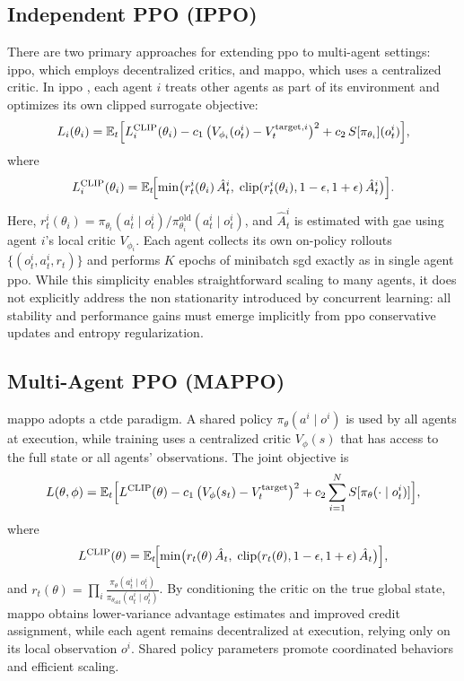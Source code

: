 \subsection{Independent PPO (IPPO)}
There are two primary approaches for extending \gls{ppo} to multi-agent settings: \gls{ippo}, which employs decentralized critics, and \gls{mappo}, which uses a centralized critic.
In \gls{ippo} \cite{witt_is_2020}, each agent \(i\) treats other agents as part of its environment and optimizes its own clipped surrogate objective:
\[
L_i(\theta_i) = \mathbb{E}_t\Bigl[L^{\mathrm{CLIP}}_i(\theta_i) 
  - c_1\,\bigl(V_{\phi_i}(o^i_t)-V^{\text{target},i}_t\bigr)^2 
  + c_2\,S[\pi_{\theta_i}](o^i_t)\Bigr],
\]
where
\[
L^{\mathrm{CLIP}}_i(\theta_i) = \mathbb{E}_t\!\Bigl[\min\bigl(r^i_t(\theta_i)\,\hat{A}^i_t,\;\text{clip}(r^i_t(\theta_i),1-\epsilon,1+\epsilon)\,\hat{A}^i_t\bigr)\Bigr].
\]
Here, \(r^i_t(\theta_i)=\pi_{\theta_i}(a^i_t\mid o^i_t)/\pi_{\theta_i}^{\mathrm{old}}(a^i_t\mid o^i_t)\), and \(\hat{A}^i_t\) is estimated with \gls{gae} using agent \(i\)'s local critic \(V_{\phi_i}\). Each agent collects its own on-policy rollouts \(\{(o^i_t,a^i_t,r_t)\}\) and performs \(K\) epochs of minibatch \gls{sgd} exactly as in single agent \gls{ppo}.  While this simplicity enables straightforward scaling to many agents, it does not explicitly address the non stationarity introduced by concurrent learning: all stability and performance gains must emerge implicitly from \gls{ppo} conservative updates and entropy regularization.

\subsection{Multi-Agent PPO (MAPPO)}
\gls{mappo} \cite{yu_surprising_2022} adopts a \gls{ctde} paradigm. A shared policy \(\pi_\theta(a^i\mid o^i)\) is used by all agents at execution, while training uses a centralized critic \(V_\phi(s)\) that has access to the full state or all agents' observations. The joint objective is
\[
L(\theta,\phi) = \mathbb{E}_t\Bigl[L^{\mathrm{CLIP}}(\theta)
  - c_1\,\bigl(V_\phi(s_t)-V^{\text{target}}_t\bigr)^2
  + c_2 \sum_{i=1}^N S[\pi_\theta(\cdot\mid o^i_t)]\Bigr],
\]
where 
\[
L^{\mathrm{CLIP}}(\theta) = \mathbb{E}_t\!\Bigl[\min\bigl(r_t(\theta)\,\hat{A}_t,\;\text{clip}(r_t(\theta),1-\epsilon,1+\epsilon)\,\hat{A}_t\bigr)\Bigr],
\]
and \(r_t(\theta)=\prod_i \frac{\pi_\theta(a^i_t\mid o^i_t)}{\pi_{\theta_{\text{old}}}(a^i_t\mid o^i_t)}\). By conditioning the critic on the true global state, \gls{mappo} obtains lower-variance advantage estimates and improved credit assignment, while each agent remains decentralized at execution, relying only on its local observation \(o^i\). Shared policy parameters promote coordinated behaviors and efficient scaling.

